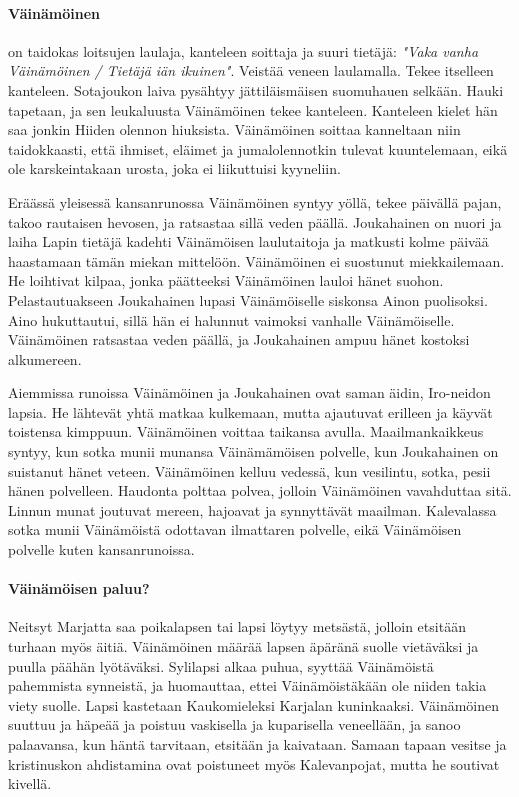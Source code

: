   \paragraph{Väinämöinen} on taidokas loitsujen laulaja, kanteleen soittaja ja suuri tietäjä:
    \emph{"Vaka vanha Väinämöinen / Tietäjä iän ikuinen"}. Veistää veneen 
    laulamalla. Tekee itselleen kanteleen. Sotajoukon laiva pysähtyy jättiläismäisen suomuhauen 
    selkään. Hauki tapetaan, ja sen leukaluusta Väinämöinen tekee kanteleen. Kanteleen kielet hän 
    saa jonkin Hiiden olennon hiuksista. Väinämöinen soittaa kanneltaan niin taidokkaasti, että 
    ihmiset, eläimet ja jumalolennotkin tulevat kuuntelemaan, eikä ole karskeintakaan urosta, joka 
    ei liikuttuisi kyyneliin. \par
    Eräässä yleisessä kansanrunossa Väinämöinen syntyy 
    yöllä, tekee päivällä pajan, takoo rautaisen hevosen, ja ratsastaa sillä veden päällä.
    Joukahainen on nuori ja laiha Lapin tietäjä kadehti Väinämöisen laulutaitoja ja matkusti 
    kolme päivää haastamaan tämän miekan mittelöön. Väinämöinen ei suostunut miekkailemaan. He 
    loihtivat kilpaa, jonka päätteeksi Väinämöinen lauloi hänet suohon. Pelastautuakseen 
    Joukahainen lupasi Väinämöiselle siskonsa Ainon puolisoksi. Aino hukuttautui, sillä hän ei 
    halunnut vaimoksi vanhalle Väinämöiselle. Väinämöinen ratsastaa veden päällä, ja Joukahainen 
    ampuu hänet kostoksi alkumereen. \par Aiemmissa runoissa Väinämöinen ja Joukahainen ovat saman 
    äidin, Iro-neidon lapsia. He lähtevät yhtä matkaa kulkemaan, mutta ajautuvat erilleen ja 
    käyvät toistensa kimppuun. Väinämöinen voittaa taikansa avulla. Maailmankaikkeus syntyy, kun 
    sotka munii munansa Väinämämöisen polvelle, kun Joukahainen on suistanut hänet veteen. 
    Väinämöinen kelluu vedessä, kun vesilintu, sotka, pesii hänen polvelleen. Haudonta polttaa 
    polvea, jolloin Väinämöinen vavahduttaa sitä. Linnun munat joutuvat mereen, hajoavat ja 
    synnyttävät maailman. Kalevalassa sotka munii Väinämöistä odottavan ilmattaren polvelle, 
    eikä Väinämöisen polvelle kuten kansanrunoissa. 
  \paragraph{Väinämöisen paluu?} Neitsyt Marjatta saa poikalapsen tai lapsi löytyy metsästä, 
    jolloin etsitään turhaan myös äitiä. Väinämöinen määrää lapsen äpäränä suolle vietäväksi ja 
    puulla päähän lyötäväksi. Sylilapsi alkaa puhua, syyttää Väinämöistä pahemmista synneistä, 
    ja huomauttaa, ettei Väinämöistäkään ole niiden takia viety suolle. Lapsi kastetaan 
    Kaukomieleksi Karjalan kuninkaaksi. Väinämöinen suuttuu ja häpeää ja poistuu vaskisella ja 
    kuparisella veneellään, ja sanoo palaavansa, kun häntä tarvitaan, etsitään ja kaivataan. 
    Samaan tapaan vesitse ja kristinuskon ahdistamina ovat poistuneet myös Kalevanpojat, mutta 
    he soutivat kivellä.


